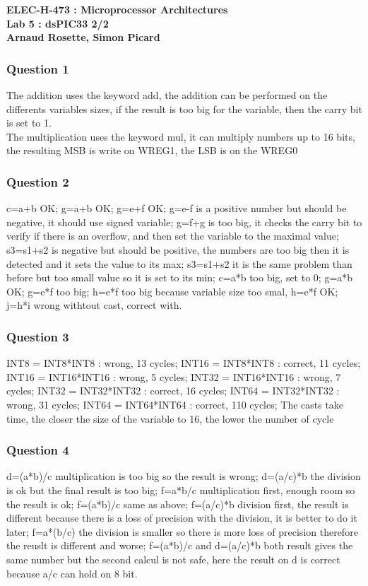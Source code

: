 \documentclass[a4paper,10pt]{article}
\begin{document}
\begin{center}
\textbf{ELEC-H-473 : Microprocessor Architectures\\ Lab 5 : dsPIC33 2/2\\Arnaud Rosette, Simon Picard}
\end{center}

\subsubsection*{Question 1}
The addition uses the keyword add, the addition can be performed on the differents variables sizes, if the result is too big for the variable, then the carry bit is set to 1.\\
The multiplication uses the keyword mul, it can multiply numbers up to 16 bits, the resulting MSB is write on WREG1, the LSB is on the WREG0

\subsubsection*{Question 2}
c=a+b OK; g=a+b OK; g=e+f OK; g=e-f is a positive number but should be negative, it should use signed variable; g=f+g is too big, it checks the carry bit to verify if there is an overflow, and then set the variable to the maximal value; s3=s1+s2 is negative but should be positive, the numbers are too big then it is detected and it sets the value to its max; s3=s1+s2 it is the same problem than before but too small value so it is set to its min; c=a*b too big, set to 0; g=a*b OK; g=e*f too big; h=e*f too big because variable size too smal, h=e*f OK; j=h*i wrong withtout cast, correct with.

\subsubsection*{Question 3}
INT8 = INT8*INT8 : wrong, 13 cycles; 
INT16 = INT8*INT8 : correct, 11 cycles; 
INT16 = INT16*INT16 : wrong, 5 cycles; 
INT32 = INT16*INT16 : wrong, 7 cycles; 
INT32 = INT32*INT32 : correct, 16 cycles; 
INT64 = INT32*INT32 : wrong, 31 cycles; 
INT64 = INT64*INT64 : correct, 110 cycles; 
The casts take time, the closer the size of the variable to 16, the lower the number of cycle

\subsubsection*{Question 4}
d=(a*b)/c multiplication is too big so the result is wrong; 
d=(a/c)*b the division is ok but the final result is too big; 
f=a*b/c multiplication first, enough room so the result is ok; 
f=(a*b)/c same as above; 
f=(a/c)*b division first, the result is different because there is a loss of precision with the division, it is better to do it later; 
f=a*(b/c) the division is smaller so there is more loss of precision therefore the reuslt is different and worse; 
f=(a*b)/c and 
d=(a/c)*b both result gives the same number but the second calcul is not safe, here the result on d is correct because a/c can hold on 8 bit.
    
\end{document}

